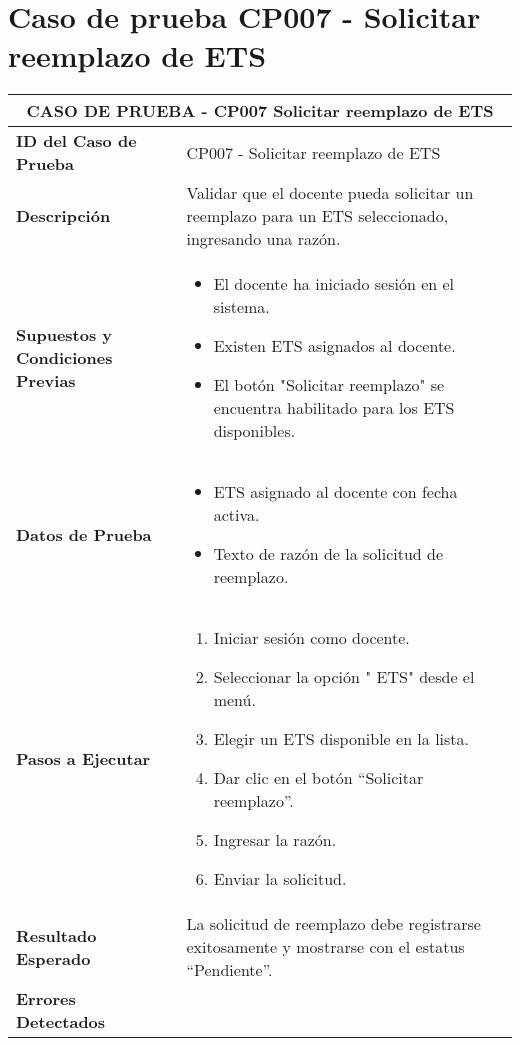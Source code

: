\section{Caso de prueba CP007 - Solicitar reemplazo de ETS}

\begin{longtable}{|p{5cm}|p{10cm}|}
	\hline
	\multicolumn{2}{|c|}{\textbf{CASO DE PRUEBA - CP007 Solicitar reemplazo de ETS}} \\
	\hline
	\textbf{ID del Caso de Prueba} & CP007 - Solicitar reemplazo de ETS \\
	\hline
	\textbf{Descripción} & Validar que el docente pueda solicitar un reemplazo para un ETS seleccionado, ingresando una razón. \\
	\hline
	\textbf{Supuestos y Condiciones Previas} & 
	\begin{itemize}
		\item El docente ha iniciado sesión en el sistema.
		\item Existen ETS asignados al docente.
		\item El botón "Solicitar reemplazo" se encuentra habilitado para los ETS disponibles.
	\end{itemize} \\
	\hline
	\textbf{Datos de Prueba} & 
	\begin{itemize}
		\item ETS asignado al docente con fecha activa.
		\item Texto de razón de la solicitud de reemplazo.
	\end{itemize} \\
	\hline
	\textbf{Pasos a Ejecutar} & 
	\begin{enumerate}
		\item Iniciar sesión como docente.
		\item Seleccionar la opción " ETS" desde el menú.
		\item Elegir un ETS disponible en la lista.
		\item Dar clic en el botón “Solicitar reemplazo”.
		\item Ingresar la razón.
		\item Enviar la solicitud.
	\end{enumerate} \\
	\hline
	\textbf{Resultado Esperado} & 
	La solicitud de reemplazo debe registrarse exitosamente y mostrarse con el estatus “Pendiente”. \\
	\hline
	\textbf{Errores Detectados} & 
	\begin{itemize}

\end{itemize}
\end{longtable}
